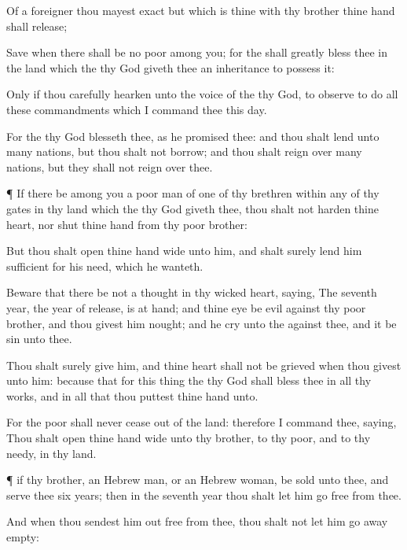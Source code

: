{Of a
foreigner thou mayest
exact
{} but
{} which is thine with thy
brother thine
hand shall
release;

Save when there shall be no
poor among you; for the
{} shall
greatly
bless thee in the
land which the
{} thy
God
giveth thee
{} an
inheritance to
possess it:

Only if thou
carefully
hearken unto the
voice of the
{} thy
God, to
observe to
do all these
commandments which I
command thee this
day.

For the
{} thy
God
blesseth thee, as he
promised thee: and thou shalt
lend unto
many
nations, but thou shalt not
borrow; and thou shalt
reign over
many
nations, but they shall not
reign over thee.


\par }{\PP {}¶ If there be among you a poor
man of
one of thy
brethren within
any of thy
gates in thy
land which the
{} thy
God
giveth thee, thou shalt not
harden thine
heart, nor
shut thine
hand from thy
poor
brother:

But thou shalt
open thine
hand
wide unto him, and shalt
surely
lend him
sufficient for his
need,
{} which he
wanteth.

Beware that there be not a
thought in thy
wicked
heart,
saying, The
seventh
year, the
year of
release, is at
hand; and thine
eye be
evil against thy
poor
brother, and thou
givest him nought; and he
cry unto the
{} against thee, and it be
sin unto thee.

Thou shalt
surely
give him, and thine
heart shall not be
grieved when thou
givest unto him:
because that for this
thing the
{} thy
God shall
bless thee in all thy
works, and in all that thou
puttest thine
hand unto.

For the
poor shall never
cease out
of the
land: therefore I
command thee,
saying, Thou shalt
open thine
hand
wide unto thy
brother, to thy
poor, and to thy
needy, in thy
land.


\par }{\PP {}¶
{} if thy
brother, an Hebrew
man, or an Hebrew
woman, be
sold unto thee, and
serve thee
six
years; then in the
seventh
year thou shalt let him
go
free from thee.

And when thou
sendest him out
free from thee, thou shalt not let him go
away
empty:

}
